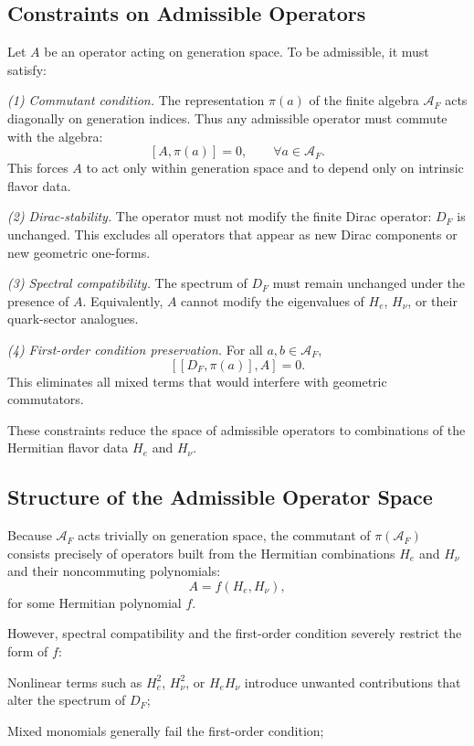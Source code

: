 \subsection{Constraints on Admissible Operators}

Let $A$ be an operator acting on generation space. To be admissible, it must satisfy:

\emph{(1) Commutant condition.}
The representation $\pi(a)$ of the finite algebra $\mathcal A_F$ acts diagonally on generation indices. Thus any admissible operator must commute with the algebra:
\[
[A,\pi(a)] = 0,\qquad \forall a\in\mathcal A_F.
\]
This forces $A$ to act only within generation space and to depend only on intrinsic flavor data.

\emph{(2) Dirac-stability.}
The operator must not modify the finite Dirac operator: $D_F$ is unchanged. This excludes all operators that appear as new Dirac components or new geometric one-forms.

\emph{(3) Spectral compatibility.}
The spectrum of $D_F$ must remain unchanged under the presence of $A$. Equivalently, $A$ cannot modify the eigenvalues of $H_e$, $H_\nu$, or their quark-sector analogues.

\emph{(4) First-order condition preservation.}
For all $a,b\in\mathcal A_F$,
\[
[[D_F,\pi(a)],A] = 0.
\]
This eliminates all mixed terms that would interfere with geometric commutators.

These constraints reduce the space of admissible operators to combinations of the Hermitian flavor data $H_e$ and $H_\nu$.

\subsection{Structure of the Admissible Operator Space}

Because $\mathcal A_F$ acts trivially on generation space, the commutant of $\pi(\mathcal A_F)$ consists precisely of operators built from the Hermitian combinations $H_e$ and $H_\nu$ and their noncommuting polynomials:
\[
A = f(H_e,H_\nu),
\]
for some Hermitian polynomial $f$.

However, spectral compatibility and the first-order condition severely restrict the form of $f$:

Nonlinear terms such as $H_e^2$, $H_\nu^2$, or $H_e H_\nu$ introduce unwanted contributions that alter the spectrum of $D_F$;

Mixed monomials generally fail the first-order condition;

